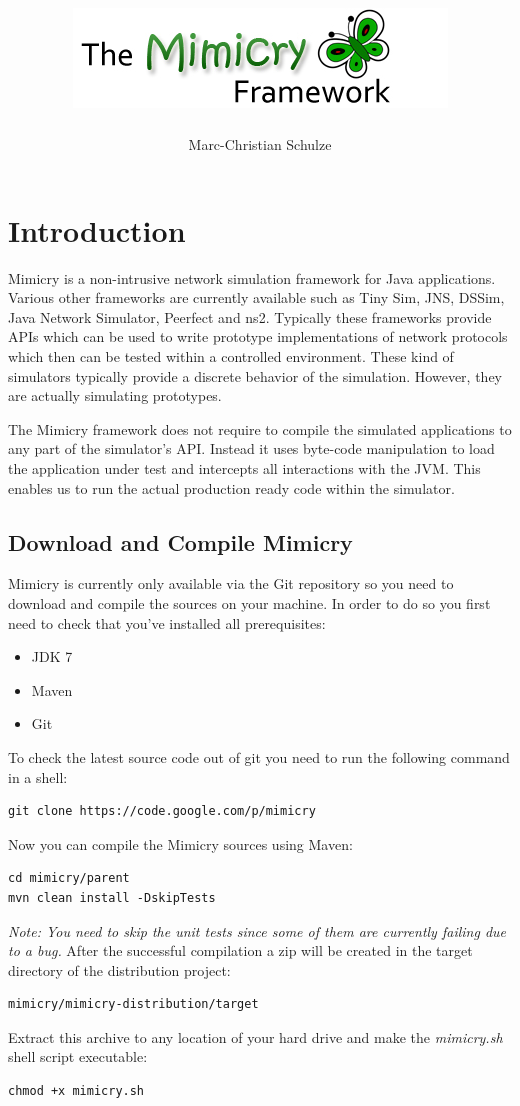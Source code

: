 \documentclass[a4paper,oneside]{book}
\title{\includegraphics[width=375px,height=100px]{Logo.jpg}}
\author{Marc-Christian Schulze}
\begin{document}
\maketitle

\tableofcontents

\chapter{Introduction}
Mimicry is a non-intrusive network simulation framework for Java applications. Various other frameworks are currently available such as Tiny Sim, JNS, DSSim, Java Network Simulator, Peerfect and ns2. Typically these frameworks provide APIs which can be used to write prototype implementations of network protocols which then can be tested within a controlled environment. These kind of simulators typically provide a discrete behavior of the simulation. However, they are actually simulating prototypes.

The Mimicry framework does not require to compile the simulated applications to any part of the simulator's API. Instead it uses byte-code manipulation to load the application under test and intercepts all interactions with the JVM. This enables us to run the actual production ready code within the simulator.


\section{Download and Compile Mimicry}
Mimicry is currently only available via the Git repository so you need to download and compile the sources on your machine. In order to do so you first need to check that you've installed all prerequisites:
\begin{itemize}
\item JDK 7
\item Maven
\item Git
\end{itemize}
To check the latest source code out of git you need to run the following command in a shell:
\begin{verbatim}
git clone https://code.google.com/p/mimicry
\end{verbatim}
Now you can compile the Mimicry sources using Maven:
\begin{verbatim}
cd mimicry/parent
mvn clean install -DskipTests
\end{verbatim}
\textit{Note: You need to skip the unit tests since some of them are currently failing due to a bug.}
After the successful compilation a zip will be created in the target directory of the distribution project:
\begin{verbatim}
mimicry/mimicry-distribution/target
\end{verbatim}
Extract this archive to any location of your hard drive and make the \textit{mimicry.sh} shell script executable:
\begin{verbatim}
chmod +x mimicry.sh
\end{verbatim}
\end{document}
